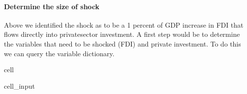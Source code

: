 \documentclass[letterpaper,10pt,english]{jupyterBook}
\begin{document}
\paragraph{Determine the size of shock}
\label{\detokenize{content/06_WBModels/ScenarioAnalysis:determine-the-size-of-shock}}
\sphinxAtStartPar
Above we identified the shock as to be a 1 percent of GDP increase in FDI that flows directly into private\sphinxhyphen{}sector investment.  A first step would be to determine the variables that need to be shocked (FDI) and private investment. To do this we can query the variable dictionary.

\begin{sphinxuseclass}{cell}\begin{sphinxVerbatimInput}

\begin{sphinxuseclass}{cell_input}
\begin{sphinxVerbatim}[commandchars=\\\{\}]
\PYG{p}{[}\PYG{p}{]}
\end{sphinxVerbatim}

\end{sphinxuseclass}\end{sphinxVerbatimInput}
\begin{sphinxVerbatimOutput}


\end{sphinxVerbatimOutput}
\end{sphinxuseclass}
\end{document}
